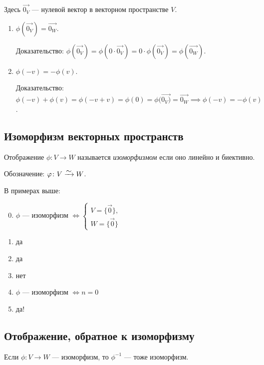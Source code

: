 Здесь $\overrightarrow{0_V}$ --- нулевой вектор в векторном пространстве $V$.

\begin{enumerate}
\item $\phi(\overrightarrow{0_V}) = \overrightarrow{0_W}$.

    Доказательство: $\phi(\overrightarrow{0_V}) = \phi(0 \cdot \overrightarrow{0_V}) = 0 \cdot \phi(\overrightarrow{0_V}) = \phi(\overrightarrow{0_W})$.

\item $\phi(-v) = -\phi(v)$.

    Доказательство: $\phi(-v) + \phi(v) = \phi(-v + v) = \phi(0) = \phi(\overrightarrow{0_V)} = \overrightarrow{0_W} \implies \phi(-v) = -\phi(v)$.
\end{enumerate}


\subsection{Изоморфизм векторных пространств}

\begin{definition}
    Отображение $\phi \colon V \to W$ называется \textit{изоморфизмом} если оно линейно и биективно.

    Обозначение: $\phi \colon V \MapsTo W$.
\end{definition}

В примерах выше:
\begin{enumerate}[nosep]
\setcounter{enumi}{-1}
\item $\phi$ --- изоморфизм $\iff \begin{cases}
    V = \{\overrightarrow{0}\}, \\
    W = \{\overrightarrow{0}\}
\end{cases}$

\item да
\item да
\item нет
\item $\phi$ --- изоморфизм $\iff n = 0$
\item да!
\end{enumerate}


\subsection{Отображение, обратное к изоморфизму}

\begin{proposal}
    \label{lec16:prop_1}
    Если $\phi \colon V \to W$ --- изоморфизм, то $\phi^{-1}$ --- тоже изоморфизм. 
\end{proposal}

